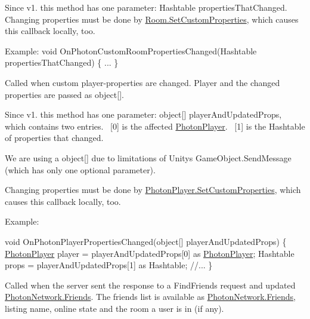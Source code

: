 \begin{Desc}
\begin{description}
Since v1. this method has one parameter\+: Hashtable properties\+That\+Changed. Changing properties must be done by \hyperlink{class_room_a9f8ac164f4f24be4140221b72792250a}{Room.\+Set\+Custom\+Properties}, which causes this callback locally, too.

Example\+: void On\+Photon\+Custom\+Room\+Properties\+Changed(\+Hashtable properties\+That\+Changed) \{ ... \} \item[{\em 
On\+Photon\+Player\+Properties\+Changed\hypertarget{group__public_api_ggaf30bbea51cc8c4b1ddc239d1c5c1468fa67402d95c324cda2b6d6e2fc391ae941}{}\label{group__public_api_ggaf30bbea51cc8c4b1ddc239d1c5c1468fa67402d95c324cda2b6d6e2fc391ae941}
}]Called when custom player-\/properties are changed. Player and the changed properties are passed as object\mbox{[}\mbox{]}. 

Since v1. this method has one parameter\+: object\mbox{[}\mbox{]} player\+And\+Updated\+Props, which contains two entries.~\newline
 \mbox{[}0\mbox{]} is the affected \hyperlink{class_photon_player}{Photon\+Player}.~\newline
 \mbox{[}1\mbox{]} is the Hashtable of properties that changed.~\newline


We are using a object\mbox{[}\mbox{]} due to limitations of Unity\textquotesingle{}s Game\+Object.\+Send\+Message (which has only one optional parameter).

Changing properties must be done by \hyperlink{class_photon_player_af8815abb8edaafbe6bddbf328f9612fb}{Photon\+Player.\+Set\+Custom\+Properties}, which causes this callback locally, too.

Example\+:
\begin{DoxyPre}
    void OnPhotonPlayerPropertiesChanged(object[] playerAndUpdatedProps) \{
        \hyperlink{class_photon_player}{PhotonPlayer} player = playerAndUpdatedProps[0] as \hyperlink{class_photon_player}{PhotonPlayer};
        Hashtable props = playerAndUpdatedProps[1] as Hashtable;
        //...
    \}\end{DoxyPre}
 \item[{\em 
On\+Updated\+Friend\+List\hypertarget{group__public_api_ggaf30bbea51cc8c4b1ddc239d1c5c1468fab39600c160a074fb0b76467956dadec9}{}\label{group__public_api_ggaf30bbea51cc8c4b1ddc239d1c5c1468fab39600c160a074fb0b76467956dadec9}
}]Called when the server sent the response to a Find\+Friends request and updated \hyperlink{class_photon_network_afd22fd553d52fdc63e975c32ea47514f}{Photon\+Network.\+Friends}. The friends list is available as \hyperlink{class_photon_network_afd22fd553d52fdc63e975c32ea47514f}{Photon\+Network.\+Friends}, listing name, online state and the room a user is in (if any).


\end{description}
\end{Desc}
